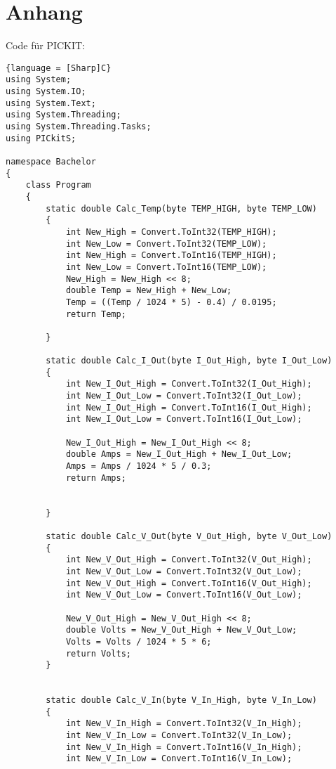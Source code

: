 \section{Anhang}

Code für PICKIT: 

\begin{lstlisting}{language = [Sharp]C}
using System;
using System.IO;
using System.Text;
using System.Threading;
using System.Threading.Tasks;
using PICkitS;

namespace Bachelor
{
    class Program
    {
        static double Calc_Temp(byte TEMP_HIGH, byte TEMP_LOW)
        {
            int New_High = Convert.ToInt32(TEMP_HIGH);
            int New_Low = Convert.ToInt32(TEMP_LOW);
            int New_High = Convert.ToInt16(TEMP_HIGH);
            int New_Low = Convert.ToInt16(TEMP_LOW);
            New_High = New_High << 8;
            double Temp = New_High + New_Low;
            Temp = ((Temp / 1024 * 5) - 0.4) / 0.0195;
            return Temp;

        }

        static double Calc_I_Out(byte I_Out_High, byte I_Out_Low)
        {
            int New_I_Out_High = Convert.ToInt32(I_Out_High);
            int New_I_Out_Low = Convert.ToInt32(I_Out_Low);
            int New_I_Out_High = Convert.ToInt16(I_Out_High);
            int New_I_Out_Low = Convert.ToInt16(I_Out_Low);

            New_I_Out_High = New_I_Out_High << 8;
            double Amps = New_I_Out_High + New_I_Out_Low;
            Amps = Amps / 1024 * 5 / 0.3;
            return Amps;


        }

        static double Calc_V_Out(byte V_Out_High, byte V_Out_Low)
        {
            int New_V_Out_High = Convert.ToInt32(V_Out_High);
            int New_V_Out_Low = Convert.ToInt32(V_Out_Low);
            int New_V_Out_High = Convert.ToInt16(V_Out_High);
            int New_V_Out_Low = Convert.ToInt16(V_Out_Low);

            New_V_Out_High = New_V_Out_High << 8;
            double Volts = New_V_Out_High + New_V_Out_Low;
            Volts = Volts / 1024 * 5 * 6;
            return Volts;
        }


        static double Calc_V_In(byte V_In_High, byte V_In_Low)
        {
            int New_V_In_High = Convert.ToInt32(V_In_High);
            int New_V_In_Low = Convert.ToInt32(V_In_Low);
            int New_V_In_High = Convert.ToInt16(V_In_High);
            int New_V_In_Low = Convert.ToInt16(V_In_Low);


\end{lstlisting}
